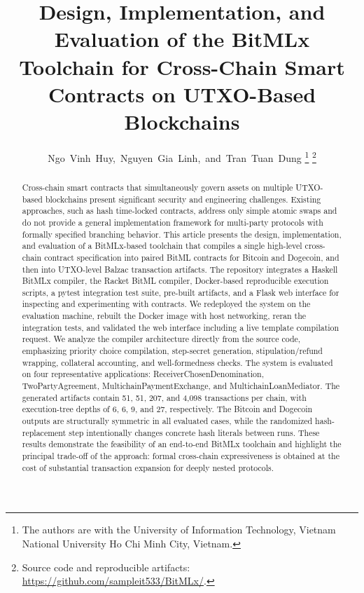 \documentclass[journal]{IEEEtran}
\begin{document}
\title{Design, Implementation, and Evaluation of the BitMLx Toolchain for Cross-Chain Smart Contracts on UTXO-Based Blockchains}

\author{Ngo~Vinh~Huy,~Nguyen~Gia~Linh,~and~Tran~Tuan~Dung%
\thanks{The authors are with the University of Information Technology, Vietnam National University Ho Chi Minh City, Vietnam.}%
\thanks{Source code and reproducible artifacts: \protect\url{https://github.com/sampleit533/BitMLx/}.}}

\maketitle

\begin{abstract}
Cross-chain smart contracts that simultaneously govern assets on multiple UTXO-based blockchains present significant security and engineering challenges. Existing approaches, such as hash time-locked contracts, address only simple atomic swaps and do not provide a general implementation framework for multi-party protocols with formally specified branching behavior. This article presents the design, implementation, and evaluation of a BitMLx-based toolchain that compiles a single high-level cross-chain contract specification into paired BitML contracts for Bitcoin and Dogecoin, and then into UTXO-level Balzac transaction artifacts. The repository integrates a Haskell BitMLx compiler, the Racket BitML compiler, Docker-based reproducible execution scripts, a pytest integration test suite, pre-built artifacts, and a Flask web interface for inspecting and experimenting with contracts. We redeployed the system on the evaluation machine, rebuilt the Docker image with host networking, reran the integration tests, and validated the web interface including a live template compilation request. We analyze the compiler architecture directly from the source code, emphasizing priority choice compilation, step-secret generation, stipulation/refund wrapping, collateral accounting, and well-formedness checks. The system is evaluated on four representative applications: ReceiverChosenDenomination, TwoPartyAgreement, MultichainPaymentExchange, and MultichainLoanMediator. The generated artifacts contain 51, 51, 207, and 4,098 transactions per chain, with execution-tree depths of 6, 6, 9, and 27, respectively. The Bitcoin and Dogecoin outputs are structurally symmetric in all evaluated cases, while the randomized hash-replacement step intentionally changes concrete hash literals between runs. These results demonstrate the feasibility of an end-to-end BitMLx toolchain and highlight the principal trade-off of the approach: formal cross-chain expressiveness is obtained at the cost of substantial transaction expansion for deeply nested protocols.
\end{abstract}
\end{document}
